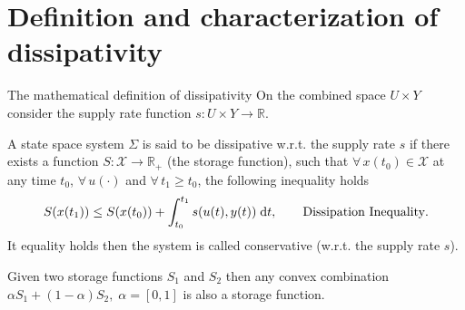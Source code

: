 \documentclass[aspectratio=169]{beamer}
\newcommand{\bbR}{\mathbb{R}}
\begin{document}
\section{Definition and characterization of dissipativity}

\begin{frame}{The mathematical definition of dissipativity}
On the combined space $U × Y$ consider the supply rate function $s : U \times Y \rightarrow \bbR$.

\begin{definition}
A state space system $\Sigma$ is said to be dissipative w.r.t. the supply rate $s$ if there exists a function $S : \mathcal{X} \rightarrow \bbR_+$ (the storage function), such
that $\forall \, x(t_0) \in \mathcal{X}$ at any time $t_0$, $\forall\,  u(\cdot)$ and $\forall\, t_1 \ge t_0$, the following inequality holds
\begin{equation}\label{eq:diss_ineq}
	S(x(t_1)) \le S(x(t_0)) + \int_{t_0}^{t_1} s(u(t), y(t)) \d t, \qquad \text{Dissipation Inequality}.
\end{equation}
It equality holds then the system is called conservative (w.r.t. the supply rate $s$). 
\end{definition}
\begin{corollary}
	Given two storage functions $S_1$ and $S_2$ then any convex combination $\alpha S_1 + (1-\alpha) S_2, \; \alpha=[0,1]$ is also a storage function.
\end{corollary}

\end{frame}
\end{document}
